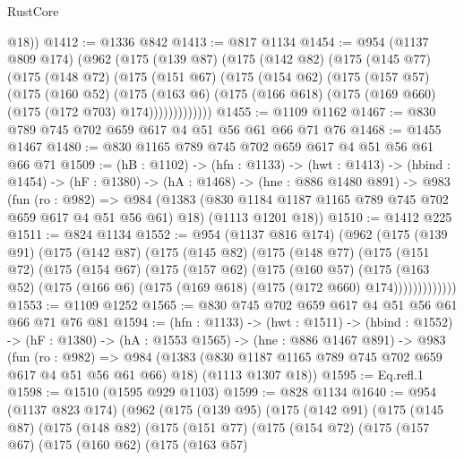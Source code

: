 \begin{lexlean}{RustCore}
\begin{coremodule}
        @18))
@1412 := @1336 @842
@1413 := @817 @1134
@1454 := @954
    (@1137 @809 @174)
    (@962
      (@175
        (@139 @87)
        (@175
          (@142 @82)
          (@175
            (@145 @77)
            (@175
              (@148 @72)
              (@175
                (@151 @67)
                (@175
                  (@154 @62)
                  (@175
                    (@157 @57)
                    (@175
                      (@160 @52)
                      (@175
                        (@163 @6)
                        (@175 (@166 @618) (@175 (@169 @660) (@175 (@172 @703) @174)))))))))))))
@1455 := @1109 @1162
@1467 := @830 @789 @745 @702 @659 @617 @4 @51 @56 @61 @66 @71 @76
@1468 := @1455 @1467
@1480 := @830 @1165 @789 @745 @702 @659 @617 @4 @51 @56 @61 @66 @71
@1509 := (hB : @1102) ->
  (hfn : @1133) ->
  (hwt : @1413) ->
  (hbind : @1454) ->
  (hF : @1380) ->
  (hA : @1468) ->
  (hne : @886 @1480 @891) ->
  @983
    (fun (ro : @982) =>
    @984
      (@1383 (@830 @1184 @1187 @1165 @789 @745 @702 @659 @617 @4 @51 @56 @61) @18)
      (@1113 @1201 @18))
@1510 := @1412 @225
@1511 := @824 @1134
@1552 := @954
    (@1137 @816 @174)
    (@962
      (@175
        (@139 @91)
        (@175
          (@142 @87)
          (@175
            (@145 @82)
            (@175
              (@148 @77)
              (@175
                (@151 @72)
                (@175
                  (@154 @67)
                  (@175
                    (@157 @62)
                    (@175
                      (@160 @57)
                      (@175
                        (@163 @52)
                        (@175 (@166 @6) (@175 (@169 @618) (@175 (@172 @660) @174)))))))))))))
@1553 := @1109 @1252
@1565 := @830 @745 @702 @659 @617 @4 @51 @56 @61 @66 @71 @76 @81
@1594 := (hfn : @1133) ->
  (hwt : @1511) ->
  (hbind : @1552) ->
  (hF : @1380) ->
  (hA : @1553 @1565) ->
  (hne : @886 @1467 @891) ->
  @983
    (fun (ro : @982) =>
    @984
      (@1383 (@830 @1187 @1165 @789 @745 @702 @659 @617 @4 @51 @56 @61 @66) @18)
      (@1113 @1307 @18))
@1595 := Eq.refl.{1}
@1598 := @1510 (@1595 @929 @1103)
@1599 := @828 @1134
@1640 := @954
    (@1137 @823 @174)
    (@962
      (@175
        (@139 @95)
        (@175
          (@142 @91)
          (@175
            (@145 @87)
            (@175
              (@148 @82)
              (@175
                (@151 @77)
                (@175
                  (@154 @72)
                  (@175
                    (@157 @67)
                    (@175
                      (@160 @62)
                      (@175
                        (@163 @57)

\end{coremodule}
\end{lexlean}
